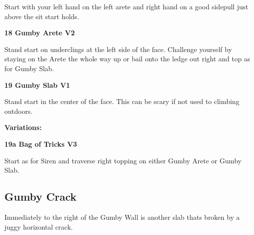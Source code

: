 \begin{multicols}{2}
\begin{adjustwidth}{0.5cm}{}
\begin{minipage}{\linewidth}
							\begin{adjustwidth}{0.5cm}{}				
							Start with your left hand on the left arete and right hand on a good sidepull just above the sit start holds.
							\end{adjustwidth}
							\end{minipage}
						\end{adjustwidth}

					\begin{minipage}{\linewidth}	
					\label{rt:Gumby Arete}
\colorbox{green!20}{
\parbox{0.95\textwidth}{
\textbf{
18 Gumby Arete V2    
}
}
}

					\begin{adjustwidth}{0.5cm}{}				
					Stand start on underclings at the left side of the face. Challenge yourself by staying on the Arete the whole way up or bail onto the ledge out right and top as for Gumby Slab.
					\end{adjustwidth}
					\end{minipage}
					\begin{minipage}{\linewidth}	
					\label{rt:Gumby Slab}
\colorbox{green!20}{
\parbox{0.95\textwidth}{
\textbf{
19 Gumby Slab V1     
}
}
}

					\begin{adjustwidth}{0.5cm}{}				
					Stand start in the center of the face. This can be scary if not used to climbing outdoors.
					\end{adjustwidth}
					\end{minipage}
						\begin{adjustwidth}{0.5cm}{}				
						\textbf{Variations:} \newline
							\begin{minipage}{\linewidth}	
							\label{vr:Bag of Tricks}
\colorbox{green!20}{
\parbox{0.95\textwidth}{
\textbf{
19a Bag of Tricks V3   
}
}
}

							\begin{adjustwidth}{0.5cm}{}				
							Start as for Siren and traverse right topping on either Gumby Arete or Gumby Slab.
							\end{adjustwidth}
							\end{minipage}
						\end{adjustwidth}
			\begin{minipage}{\columnwidth}
			\subsection*{Gumby Crack}\label{bf:Gumby Crack}
			Immediately to the right of the Gumby Wall is another slab thats broken by a juggy horizontal crack.
			

\end{minipage}
\end{multicols}

